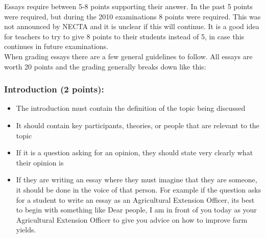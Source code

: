       Essays require between 5-8 points supporting their answer.  In the past 5 points were required, but during the 2010 examinations 8 points were required.  This was not announced by NECTA and it is unclear if this will continue.  It is a good idea for teachers to try to give 8 points to their students instead of 5, in case this continues in future examinations. \\

      When grading essays there are a few general guidelines to follow.  All essays are worth 20 points and the grading generally breaks down like this: \\

\subsubsection{Introduction (2 points):}
\begin{itemize}
\item The introduction must contain the definition of the topic being discussed
\item It should contain key participants, theories, or people that are relevant to the topic
\item If it is a question asking for an opinion, they should state very clearly what their opinion is
\item If they are writing an essay where they must imagine that they are someone, it should be done in the voice of that person.  For example if the question asks for a student to write an essay as an Agricultural Extension Officer, its best to begin with something like Dear people, I am in front of you today as your Agricultural Extension Officer to give you advice on how to improve farm yields.
\end{itemize}


